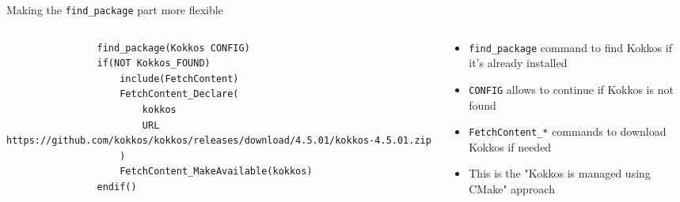 \documentclass[
    aspectratio=169,
    handout,
]{beamer}
\begin{document}
\begin{frame}[fragile]{Making the \texttt{find\_package} part more flexible}
    \begin{columns}
        \begin{column}{0.6\linewidth}
            \begin{verbatim}
                find_package(Kokkos CONFIG)
                if(NOT Kokkos_FOUND)
                    include(FetchContent)
                    FetchContent_Declare(
                        kokkos
                        URL https://github.com/kokkos/kokkos/releases/download/4.5.01/kokkos-4.5.01.zip
                    )
                    FetchContent_MakeAvailable(kokkos)
                endif()
            \end{verbatim}
        \end{column}
        \begin{column}{0.4\linewidth}
            \begin{itemize}
                \item \texttt{find\_package} command to find Kokkos if it's already installed
                \item \texttt{CONFIG} allows to continue if Kokkos is not found
                \item \texttt{FetchContent\_*} commands to download Kokkos if needed
                \item This is the "Kokkos is managed using CMake" approach
            \end{itemize}
        \end{column}
    \end{columns}
\end{frame}

\end{document}

